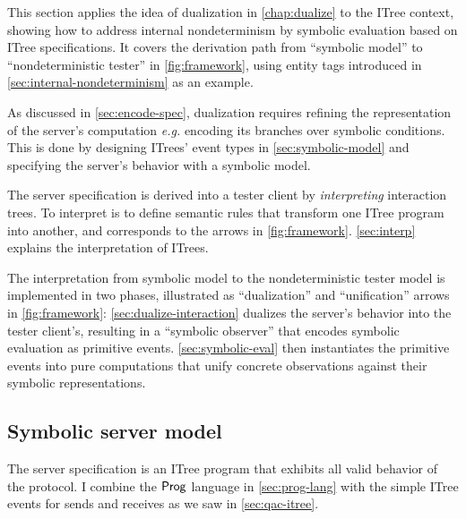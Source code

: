 This section applies the idea of dualization in \autoref{chap:dualize} to the
ITree context, showing how to address internal nondeterminism by symbolic
evaluation based on ITree specifications.  It covers the derivation path from
``symbolic model'' to ``nondeterministic tester'' in \autoref{fig:framework},
using \http entity tags introduced in \autoref{sec:internal-nondeterminism} as
an example.

As discussed in \autoref{sec:encode-spec}, dualization requires refining the
representation of the server's computation {\it e.g.} encoding its branches over
symbolic conditions.  This is done by designing ITrees' event types in
\autoref{sec:symbolic-model} and specifying the server's behavior with a
symbolic model.

The server specification is derived into a tester client by {\em interpreting}
interaction trees.  To interpret is to define semantic rules that transform one
ITree program into another, and corresponds to the arrows in
\autoref{fig:framework}.  \autoref{sec:interp} explains the interpretation of
ITrees.

The interpretation from symbolic model to the nondeterministic tester model is
implemented in two phases, illustrated as ``dualization'' and ``unification''
arrows in \autoref{fig:framework}: \autoref{sec:dualize-interaction} dualizes
the server's behavior into the tester client's, resulting in a ``symbolic
observer'' that encodes symbolic evaluation as primitive events.
\autoref{sec:symbolic-eval} then instantiates the primitive events into
pure computations that unify concrete observations against their symbolic
representations.

\subsection{Symbolic server model}
\label{sec:symbolic-model}
The server specification is an ITree program that exhibits all valid behavior of
the protocol.  I combine the $\mathsf{Prog}$ language in \autoref{sec:prog-lang} with
the simple ITree  events for sends and receives as we saw in
\autoref{sec:qac-itree}.

